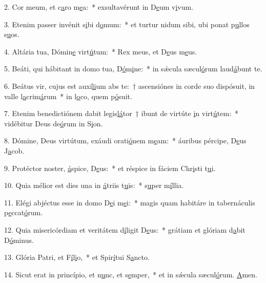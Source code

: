 2. Cor meum, et c\uline{a}ro m\uline{e}a:~* exsultavérunt in D\uline{e}um v\uline{i}vum.\par 
3. Etenim passer invénit s\uline{i}bi d\uline{o}mum:~* et turtur nidum sibi, ubi ponat p\uline{u}llos s\uline{u}os.\par 
4. Altária tua, Dómin\uline{e} virt\uline{ú}tum:~* Rex meus, et D\uline{e}us m\uline{e}us.\par 
5. Beáti, qui hábitant in domo tua, D\uline{ó}m\uline{i}ne:~* in sǽcula sæcul\uline{ó}rum laud\uline{á}bunt te.\par 
6. Beátus vir, cujus est auxí\uline{li}um abs te:~† ascensiónes in corde suo dispósuit, in valle l\uline{a}crim\uline{á}rum~* in l\uline{o}co, quem p\uline{ó}suit.\par 
7. Etenim benedictiónem dabit legis\uline{lá}tor~† ibunt de virtúte \uline{i}n virt\uline{ú}tem:~* vidébitur Deus de\uline{ó}rum in S\uline{i}on.\par 
8. Dómine, Deus virtútum, exáudi orati\uline{ó}nem m\uline{e}am:~* áuribus pércipe, D\uline{e}us J\uline{a}cob.\par 
9. Protéctor noster, \uline{á}spice, D\uline{e}us:~* et réspice in fáciem Chr\uline{i}sti t\uline{u}i.\par 
10. Quia mélior est dies una in \uline{á}triis t\uline{u}is:~* s\uline{u}per m\uline{í}llia.\par 
11. Elégi abjéctus esse in domo D\uline{e}i m\uline{e}i:~* magis quam habitáre in tabernáculis p\uline{e}ccat\uline{ó}rum.\par 
12. Quia misericórdiam et veritátem d\uline{í}ligit D\uline{e}us:~* grátiam et glóriam d\uline{a}bit D\uline{ó}minus.\par 
13. Glória Patri, et F\uline{í}l\uline{i}o,~* et Spir\uline{í}tui S\uline{a}ncto.\par 
14. Sicut erat in princípio, et n\uline{u}nc, et s\uline{e}mper,~* et in sǽcula sæcul\uline{ó}rum. \uline{A}men.\par 
